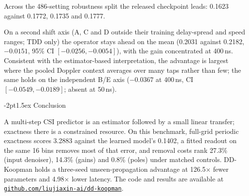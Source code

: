 \documentclass{article}
\makeatletter
\renewcommand\section{\@startsection{section}{1}{\z@}%
  {-2pt}{1.5ex}%
  {\normalfont\Large\bfseries}}
\makeatother
\begin{document}
Across the 486-setting robustness split the released checkpoint leads:
0.1623 against 0.1772, 0.1735 and 0.1777.

On a second shift axis (A, C and D outside their training delay-spread
and speed ranges; TDD only) the operator stays ahead on the mean (0.2031
against 0.2182, $-0.0151$, 95\% CI $[-0.0256,-0.0054]$), with the gain
concentrated at 400\,ns. Consistent with the estimator-based
interpretation, the advantage is largest where the pooled Doppler
context averages over many taps rather than few; the same
holds on the independent B/E
axis ($-0.0367$ at 400\,ns, CI $[-0.0549,-0.0189]$; absent at 50\,ns).

\section{Conclusion}
\label{sec:conc}

A multi-step CSI predictor is an estimator followed by a small linear
transfer; exactness there is a constrained resource. On this benchmark,
full-grid periodic exactness scores 3.2883 against the learned model's
0.1402, a fitted readout on the same 16 bins removes most of that
error, and removal costs rank 27.3\% (input denoiser), 14.3\% (gains)
and 0.8\% (poles) under matched controls. DD-Koopman holds a three-seed
unseen-propagation advantage at
126.5$\times$ fewer parameters and 4.98$\times$ lower latency. The code
and results are available at
\href{https://github.com/liujiaxin-ai/dd-koopman}{\nolinkurl{github.com/liujiaxin-ai/dd-koopman}}.

\clearpage



\end{document}
